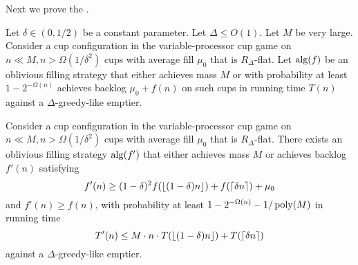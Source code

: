Next we prove the .

\begin{lemma}
  \label{lem:obliviousAmplification} 
  Let $\delta \in (0, 1/2)$ be a constant parameter. Let $\Delta
  \le O(1)$. Let $M$ be very large. Consider a cup configuration
  in the variable-processor cup game on $n\ll M, n >
  \Omega(1/\delta^2)$ cups with average fill $\mu_0$ that is
  $R_\Delta$-flat. Let $\operatorname{\text{\textup{alg}}}(f)$ be an oblivious filling strategy
  that either achieves mass $M$ or with probability at least
  $1-2^{-\Omega(n)}$ achieves backlog $\mu_0 + f(n)$ on such cups
  in running time $T(n)$ against a $\Delta$-greedy-like emptier.

  Consider a cup configuration in the variable-processor cup game
  on $n\ll M, n > \Omega(1/\delta^2)$ cups with average fill
  $\mu_0$ that is $R_\Delta$-flat. There exists an oblivious
  filling strategy $\operatorname{\text{\textup{alg}}}(f')$ that either achieves mass $M$ or
  achieves backlog $f'(n)$ satisfying $$f'(n) \ge (1-\delta)^2
  f(\left\lfloor (1-\delta)n \right\rfloor) + f(\left\lceil \delta n \right\rceil) + \mu_0$$ and
  $f'(n) \ge f(n)$, with probability at least
  $1-2^{-\Omega(n)}-1/\operatorname{\text{poly}}(M)$ in running time $$T'(n) \le
  M\cdot n\cdot T(\left\lfloor (1-\delta)n \right\rfloor) + T(\left\lceil \delta n \right\rceil)$$
  against a $\Delta$-greedy-like emptier.
\end{lemma}


